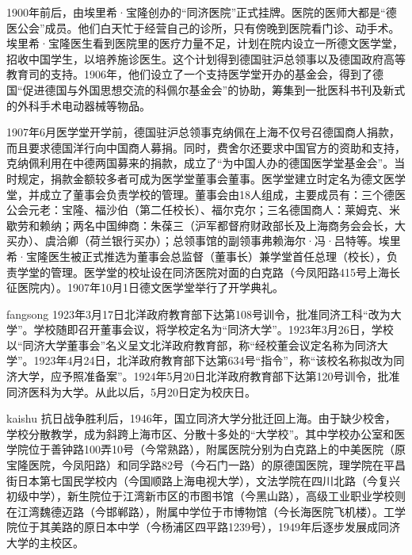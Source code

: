 {\songti 

1900年前后，由埃里希·宝隆创办的“同济医院”正式挂牌。医院的医师大都是“德医公会”成员。他们白天忙于经营自己的诊所，只有傍晚到医院看门诊、动手术。埃里希·宝隆医生看到医院里的医疗力量不足，计划在院内设立一所德文医学堂，招收中国学生，以培养施诊医生。这个计划得到德国驻沪总领事以及德国政府高等教育司的支持。1906年，他们设立了一个支持医学堂开办的基金会，得到了德国“促进德国与外国思想交流的科佩尔基金会”的协助，筹集到一批医科书刊及新式的外科手术电动器械等物品。}

{\heiti 1907年6月医学堂开学前，德国驻沪总领事克纳佩在上海不仅号召德国商人捐款，而且要求德国洋行向中国商人募捐。同时，费舍尔还要求中国官方的资助和支持，克纳佩利用在中德两国募来的捐款，成立了“为中国人办的德国医学堂基金会”。当时规定，捐款金额较多者可成为医学堂董事会董事。医学堂建立时定名为德文医学堂，并成立了董事会负责学校的管理。董事会由18人组成，主要成员有：三个德医公会元老：宝隆、福沙伯（第二任校长）、福尔克尔；三名德国商人：莱姆克、米歇劳和赖纳；两名中国绅商：朱葆三（沪军都督府财政部长及上海商务会会长，大买办）、虞洽卿（荷兰银行买办）；总领事馆的副领事弗赖海尔·冯·吕特等。埃里希·宝隆医生被正式推选为董事会总监督（董事长）兼学堂首任总理（校长），负责学堂的管理。医学堂的校址设在同济医院对面的白克路（今凤阳路415号上海长征医院内）。1907年10月1日德文医学堂举行了开学典礼。}

{\ifcsname fangsong\endcsname\fangsong\else[无 \cs{fangsong} 字体。]\fi 
1923年3月17日北洋政府教育部下达第108号训令，批准同济工科“改为大学”。学校随即召开董事会议，将学校定名为“同济大学”。1923年3月26日，学校以“同济大学董事会”名义呈文北洋政府教育部，称“经校董会议定名称为同济大学”。1923年4月24日，北洋政府教育部下达第634号“指令”，称“该校名称拟改为同济大学，应予照准备案”。1924年5月20日北洋政府教育部下达第120号训令，批准同济医科为大学。从此以后，5月20日定为校庆日。}

{\ifcsname kaishu\endcsname\kaishu\else[无 \cs{kaishu} 字体。]\fi 
抗日战争胜利后，1946年，国立同济大学分批迁回上海。由于缺少校舍，学校分散教学，成为斜跨上海市区、分散十多处的“大学校”。其中学校办公室和医学院位于善钟路100弄10号（今常熟路），附属医院分别为白克路上的中美医院（原宝隆医院，今凤阳路）和同孚路82号（今石门一路）的原德国医院，理学院在平昌街日本第七国民学校内（今国顺路上海电视大学），文法学院在四川北路（今复兴初级中学），新生院位于江湾新市区的市图书馆（今黑山路），高级工业职业学校则在江湾魏德迈路（今邯郸路），附属中学位于市博物馆（今长海医院飞机楼）。工学院位于其美路的原日本中学（今杨浦区四平路1239号），1949年后逐步发展成同济大学的主校区。}



